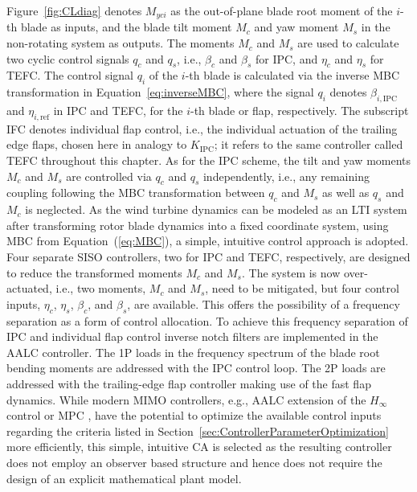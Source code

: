 Figure~\ref{fig:CLdiag} denotes $M_{yci}$ as the out-of-plane blade root moment of the $i$-th blade as inputs, and the blade tilt moment $M_c$ and yaw moment $M_s$ in the non-rotating system as outputs. The moments $M_c$ and $M_s$ are used to calculate two cyclic control signals $q_c$ and $q_s$, i.e., $\beta_c$ and $\beta_s$ for IPC, and $\eta_c$ and $\eta_s$ for TEFC. The control signal $q_i$ of the $i$-th blade is calculated via the inverse MBC transformation in Equation~\eqref{eq:inverseMBC},
where the signal $q_i$ denotes $\beta_{i,\text{IPC}}$ and $\eta_{i,\text{ref}}$ in IPC and TEFC, for the $i$-th blade or flap, respectively. The subscript IFC denotes individual flap control, i.e., the individual actuation of the trailing edge flaps, chosen here in analogy to $K_\mathrm{IPC}$; it refers to the same controller called TEFC throughout this chapter. As for the IPC scheme, the tilt and yaw moments $M_c$ and $M_s$ are controlled via $q_c$ and $q_s$ independently, i.e., any remaining coupling following the MBC transformation between $q_c$ and $M_s$ as well as $q_s$ and $M_c$ is neglected. As the wind turbine dynamics can be modeled as an LTI system after transforming rotor blade dynamics into a fixed coordinate system, using MBC from Equation~(\ref{eq:MBC}), a simple, intuitive control approach is adopted. Four separate SISO controllers, two for IPC and TEFC, respectively, are designed to reduce the transformed moments $M_c$ and $M_s$. The system is now over-actuated, i.e., two moments, $M_c$ and $M_s$, need to be mitigated, but four control inputs, $\eta_c$, $\eta_s$, $\beta_c$, and $\beta_s$, are available. This offers the possibility of a frequency separation as a form of control allocation. To achieve this frequency separation of IPC and individual flap control inverse notch filters are implemented in the AALC controller. The 1P loads in the frequency spectrum of the blade root bending moments are addressed with the IPC control loop. The 2P loads are addressed with the trailing-edge flap controller making use of the fast flap dynamics. While modern MIMO controllers, e.g.,  AALC extension of the $H_\infty$ control \cite{ossmann2021field,ossmann2017load} or MPC \cite{dittmer2021velocity}, have the potential to optimize the available control inputs regarding the criteria listed in Section~\ref{sec:ControllerParameterOptimization} more efficiently, this simple, intuitive CA is selected as the resulting controller does not employ an observer based structure and hence does not require the design of an explicit mathematical plant model.%

